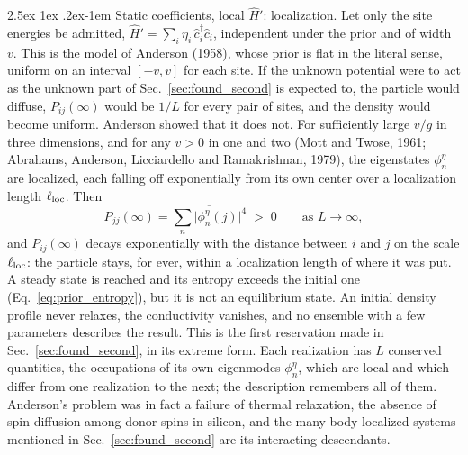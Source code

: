 \documentclass[10pt,a4paper]{article}
\makeatletter
\renewcommand{\paragraph}{\@startsection{paragraph}{4}{\z@}%
  {2.5ex \@plus 1ex \@minus .2ex}{-1em}%
  {\normalfont\fontsize{14pt}{17pt}\selectfont\bfseries}}
\makeatother
\begin{document}
\paragraph{Static coefficients, local $ \hat H' $: localization.}
Let only the site energies be admitted, $ \hat H' = \sum_i\eta_i\,\hat c_i^\dagger\hat c_i $, independent under the prior and of width $ v $.
This is the model of Anderson (1958), whose prior is flat in the literal sense, uniform on an interval $ [-v, v] $ for each site.
If the unknown potential were to act as the unknown part of Sec.~\ref{sec:found_second} is expected to, the particle would diffuse, $ P_{ij}(\infty) $ would be $ 1/L $ for every pair of sites, and the density would become uniform.
Anderson showed that it does not.
For sufficiently large $ v/g $ in three dimensions, and for any $ v > 0 $ in one and two (Mott and Twose, 1961; Abrahams, Anderson, Licciardello and Ramakrishnan, 1979), the eigenstates $ \phi_n^{\eta} $ are localized, each falling off exponentially from its own center over a localization length $ \ell_{\rm loc} $.
Then
\[
  P_{jj}(\infty) = \overline{\sum_n\big|\phi_n^{\eta}(j)\big|^{4}} \;>\; 0
  \qquad\text{as } L \to \infty ,
\]
and $ P_{ij}(\infty) $ decays exponentially with the distance between $ i $ and $ j $ on the scale $ \ell_{\rm loc} $: the particle stays, for ever, within a localization length of where it was put.
A steady state is reached and its entropy exceeds the initial one (Eq.~\eqref{eq:prior_entropy}), but it is not an equilibrium state.
An initial density profile never relaxes, the conductivity vanishes, and no ensemble with a few parameters describes the result.
This is the first reservation made in Sec.~\ref{sec:found_second}, in its extreme form.
Each realization has $ L $ conserved quantities, the occupations of its own eigenmodes $ \phi_n^{\eta} $, which are local and which differ from one realization to the next; the description remembers all of them.
Anderson's problem was in fact a failure of thermal relaxation, the absence of spin diffusion among donor spins in silicon, and the many-body localized systems mentioned in Sec.~\ref{sec:found_second} are its interacting descendants.
\end{document}
